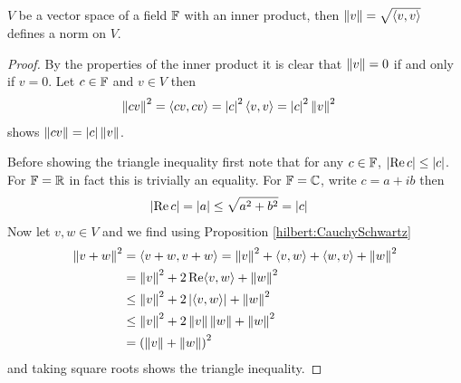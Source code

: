 \begin{prop}\label{hilbert:InnerProductNorm} $V$ be a vector space of
  a field $\mathbb{F}$ with an inner product, then $\left \lVert v \right \rVert =
  \sqrt{\langle v, v \rangle}$ defines a norm on $V$.
\end{prop}
\begin{proof}
  By the properties of the inner product it is clear that $\left \lVert v \right \rVert =
  0$ if and only if $v = 0$.   Let $c \in \mathbb{F}$  and $v \in V$ then
  \begin{align*}
    \left \lVert cv \right \rVert^2 &= \langle cv, cv \rangle = \left \vert c \right \vert^2 \langle v, v
                  \rangle = \left \vert c \right \vert^2 \left \lVert v \right \rVert^2
  \end{align*}
  shows $\left \lVert cv \right \rVert = \left \vert c \right \vert \left \lVert v \right \rVert$.

Before showing the triangle inequality first note that for any $c \in \mathbb{F}$,
$\left \vert \operatorname*{Re}{c} \right \vert \leq \left \vert c \right \vert$.   For $\mathbb{F} = \mathbb{R}$ in fact this
is trivially an equality.   For $\mathbb{F} = \mathbb{C}$, write $c = a +
ib$ then
\begin{align*}
  \left \vert \operatorname*{Re}{c} \right \vert &= \left \vert a \right \vert \leq \sqrt{a^2 + b^2} = \left \vert c \right \vert
\end{align*}
Now let $v,w \in V$ and we find using Proposition \ref{hilbert:CauchySchwartz}
\begin{align*}
  \left \lVert v + w \right \rVert^2 &= \langle v + w, v + w \rangle = \left \lVert v \right \rVert^2 +
                 \langle v, w \rangle + \langle w, v \rangle +
                 \left \lVert w \right \rVert^2 \\
               &= \left \lVert v \right \rVert^2 + 2 \operatorname*{Re} \langle v, w \rangle +  \left \lVert w \right \rVert^2 \\
  &\leq \left \lVert v \right \rVert^2 + 2 \left \vert \langle v, w \rangle \right \vert +  \left \lVert w \right \rVert^2 \\
  &\leq \left \lVert v \right \rVert^2 + 2 \left \lVert v \right \rVert \left \lVert w \right \rVert +  \left \lVert w \right \rVert^2 \\
  &= \left( \left \lVert v \right \rVert+ \left \lVert w \right \rVert \right)^2
\end{align*}
and taking square roots shows the triangle inequality.
\end{proof}


